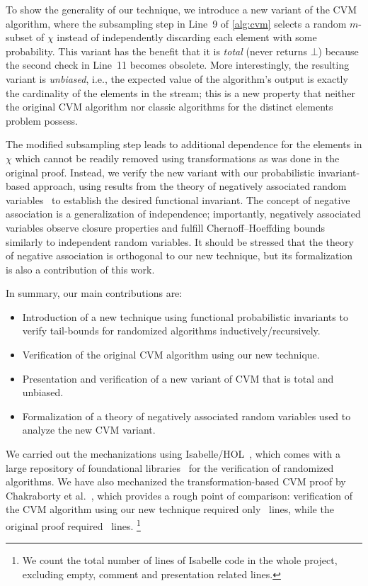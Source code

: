 To show the generality of our technique, we introduce a new variant of the CVM algorithm, where the subsampling step in Line~9 of \cref{alg:cvm} selects a random $m$-subset of $\chi$ instead of independently discarding each element with some probability.
This variant has the benefit that it is \emph{total} (never returns $\bot$) because the second check in Line~11 becomes obsolete.
More interestingly, the resulting variant is \emph{unbiased}, i.e., the expected value of the algorithm's output is exactly the cardinality of the elements in the stream; this is a new property that neither the original CVM algorithm nor classic algorithms for the distinct elements problem possess.

The modified subsampling step leads to additional dependence for the elements in $\chi$ which cannot be readily removed using transformations as was done in the original proof.
Instead, we verify the new variant with our probabilistic invariant-based approach, using results from the theory of negatively associated random variables~\cite{joagdev1983} to establish the desired functional invariant.
The concept of negative association is a generalization of independence; importantly, negatively associated variables observe closure properties and fulfill Chernoff--Hoeffding bounds similarly to independent random variables.
It should be stressed that the theory of negative association is orthogonal to our new technique, but its formalization is also a contribution of this work.

In summary, our main contributions are:
\begin{itemize}
\item Introduction of a new technique using functional probabilistic invariants to verify tail-bounds for randomized algorithms inductively/recursively.
\item Verification of the original CVM algorithm using our new technique.
\item Presentation and verification of a new variant of CVM that is total and unbiased.
\item Formalization of a theory of negatively associated random variables used to analyze the new CVM variant.
\end{itemize}

We carried out the mechanizations using Isabelle/HOL~\cite{nipkow2002}, which comes with a large repository of foundational libraries~\cite{afp} for the verification of randomized algorithms.
We have also mechanized the transformation-based CVM proof by Chakraborty et al.~\cite{chakraborty2022,chakraborty2023}, which provides a rough point of comparison:
verification of the CVM algorithm using our new technique required only \locnew~lines, while the original proof required \locold~lines.
\footnote{
  We count the total number of lines of Isabelle code in the whole project, excluding empty, comment and presentation related lines.
}

